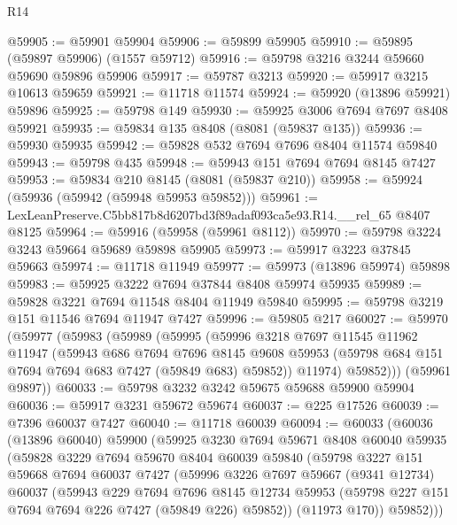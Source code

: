 \begin{lexlean}{R14}
\begin{coremodule}
@59905 := @59901 @59904
@59906 := @59899 @59905
@59910 := @59895 (@59897 @59906) (@1557 @59712)
@59916 := @59798 @3216 @3244 @59660 @59690 @59896 @59906
@59917 := @59787 @3213
@59920 := @59917 @3215 @10613 @59659
@59921 := @11718 @11574
@59924 := @59920 (@13896 @59921) @59896
@59925 := @59798 @149
@59930 := @59925 @3006 @7694 @7697 @8408 @59921
@59935 := @59834 @135 @8408 (@8081 (@59837 @135))
@59936 := @59930 @59935
@59942 := @59828 @532 @7694 @7696 @8404 @11574 @59840
@59943 := @59798 @435
@59948 := @59943 @151 @7694 @7694 @8145 @7427
@59953 := @59834 @210 @8145 (@8081 (@59837 @210))
@59958 := @59924 (@59936 (@59942 (@59948 @59953 @59852)))
@59961 := LexLeanPreserve.C5bb817b8d6207bd3f89adaf093ca5e93.R14.__rel_65 @8407 @8125
@59964 := @59916 (@59958 (@59961 @8112))
@59970 := @59798 @3224 @3243 @59664 @59689 @59898 @59905
@59973 := @59917 @3223 @37845 @59663
@59974 := @11718 @11949
@59977 := @59973 (@13896 @59974) @59898
@59983 := @59925 @3222 @7694 @37844 @8408 @59974 @59935
@59989 := @59828 @3221 @7694 @11548 @8404 @11949 @59840
@59995 := @59798 @3219 @151 @11546 @7694 @11947 @7427
@59996 := @59805 @217
@60027 := @59970
    (@59977
      (@59983
        (@59989
          (@59995
            (@59996
              @3218
              @7697
              @11545
              @11962
              @11947
              (@59943
                @686
                @7694
                @7696
                @8145
                @9608
                @59953
                (@59798 @684 @151 @7694 @7694 @683 @7427 (@59849 @683) @59852))
              @11974)
            @59852)))
      (@59961 @9897))
@60033 := @59798 @3232 @3242 @59675 @59688 @59900 @59904
@60036 := @59917 @3231 @59672 @59674
@60037 := @225 @17526
@60039 := @7396 @60037 @7427
@60040 := @11718 @60039
@60094 := @60033
    (@60036
      (@13896 @60040)
      @59900
      (@59925
        @3230
        @7694
        @59671
        @8408
        @60040
        @59935
        (@59828
          @3229
          @7694
          @59670
          @8404
          @60039
          @59840
          (@59798
            @3227
            @151
            @59668
            @7694
            @60037
            @7427
            (@59996
              @3226
              @7697
              @59667
              (@9341 @12734)
              @60037
              (@59943
                @229
                @7694
                @7696
                @8145
                @12734
                @59953
                (@59798 @227 @151 @7694 @7694 @226 @7427 (@59849 @226) @59852))
              (@11973 @170))
            @59852)))

\end{coremodule}
\end{lexlean}
